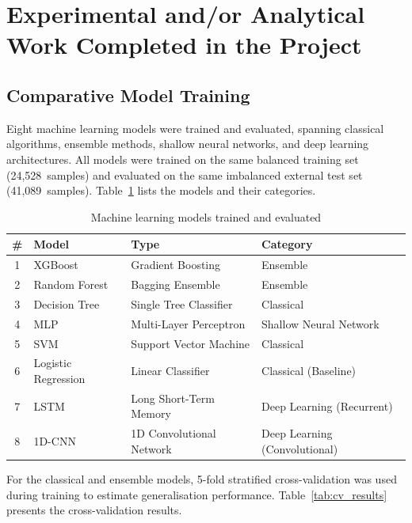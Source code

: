 \section{Experimental and/or Analytical Work Completed in the Project}

\subsection{Comparative Model Training}

Eight machine learning models were trained and evaluated, spanning classical algorithms, ensemble methods, shallow neural networks, and deep learning architectures. All models were trained on the same balanced training set (24,528~samples) and evaluated on the same imbalanced external test set (41,089~samples). Table~\ref{tab:models_trained} lists the models and their categories.

\begin{table}[htbp]
    \centering
    \caption{Machine learning models trained and evaluated}
    \label{tab:models_trained}
    \begin{tabular}{clll}
        \toprule
        \textbf{\#} & \textbf{Model} & \textbf{Type} & \textbf{Category} \\
        \midrule
        1 & XGBoost              & Gradient Boosting           & Ensemble \\
        2 & Random Forest         & Bagging Ensemble            & Ensemble \\
        3 & Decision Tree         & Single Tree Classifier      & Classical \\
        4 & MLP                   & Multi-Layer Perceptron      & Shallow Neural Network \\
        5 & SVM                   & Support Vector Machine      & Classical \\
        6 & Logistic Regression   & Linear Classifier           & Classical (Baseline) \\
        7 & LSTM                  & Long Short-Term Memory      & Deep Learning (Recurrent) \\
        8 & 1D-CNN                & 1D Convolutional Network    & Deep Learning (Convolutional) \\
        \bottomrule
    \end{tabular}
\end{table}

For the classical and ensemble models, 5-fold stratified cross-validation was used during training to estimate generalisation performance. Table~\ref{tab:cv_results} presents the cross-validation results.


